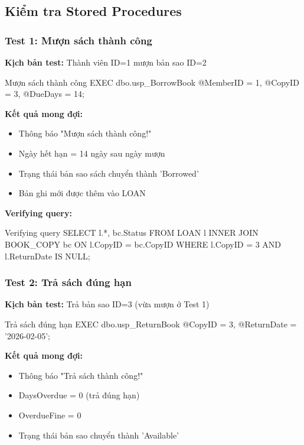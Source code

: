 \documentclass[12pt,a4paper]{article}
\begin{document}
\subsection{Kiểm tra Stored Procedures}

\subsubsection{Test 1: Mượn sách thành công}

\textbf{Kịch bản test:} Thành viên ID=1 mượn bản sao ID=2

\begin{sqlcode}{Mượn sách thành công}
EXEC dbo.usp_BorrowBook
    @MemberID = 1,
    @CopyID = 3,
    @DueDays = 14;
\end{sqlcode}

\textbf{Kết quả mong đợi:}
\begin{itemize}
    \item Thông báo "Mượn sách thành công!"
    \item Ngày hết hạn = 14 ngày sau ngày mượn
    \item Trạng thái bản sao sách chuyển thành 'Borrowed'
    \item Bản ghi mới được thêm vào LOAN
\end{itemize}

\textbf{Verifying query:}
\begin{sqlcode}{Verifying query}
SELECT l.*, bc.Status
FROM LOAN l
INNER JOIN BOOK_COPY bc ON l.CopyID = bc.CopyID
WHERE l.CopyID = 3 AND l.ReturnDate IS NULL;
\end{sqlcode}

\subsubsection{Test 2: Trả sách đúng hạn}

\textbf{Kịch bản test:} Trả bản sao ID=3 (vừa mượn ở Test 1)

\begin{sqlcode}{Trả sách đúng hạn}
EXEC dbo.usp_ReturnBook
    @CopyID = 3,
    @ReturnDate = '2026-02-05';
\end{sqlcode}

\textbf{Kết quả mong đợi:}
\begin{itemize}
    \item Thông báo "Trả sách thành công!"
    \item DaysOverdue = 0 (trả đúng hạn)
    \item OverdueFine = 0
    \item Trạng thái bản sao chuyển thành 'Available'
\end{itemize}
\end{document}
